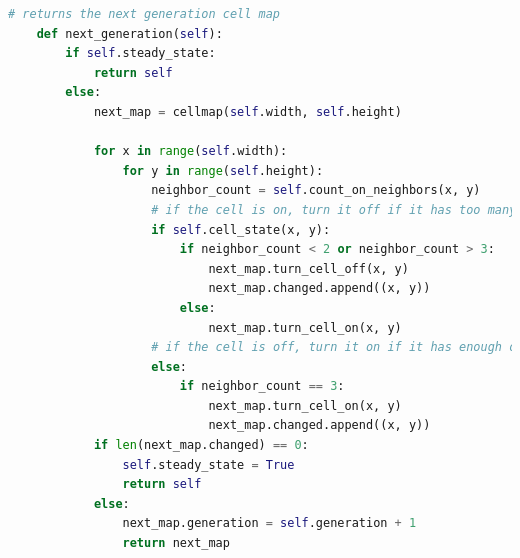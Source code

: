 \documentclass[12pt]{report}
\begin{document}
\begin{lstlisting}[language=Python, caption=cell\_map.py]
    # returns the next generation cell map
    def next_generation(self):
        if self.steady_state:
            return self
        else:
            next_map = cellmap(self.width, self.height)

            for x in range(self.width):
                for y in range(self.height):
                    neighbor_count = self.count_on_neighbors(x, y)
                    # if the cell is on, turn it off if it has too many or too few on neighbors
                    if self.cell_state(x, y):
                        if neighbor_count < 2 or neighbor_count > 3:
                            next_map.turn_cell_off(x, y)
                            next_map.changed.append((x, y))
                        else:
                            next_map.turn_cell_on(x, y)
                    # if the cell is off, turn it on if it has enough on neighbors
                    else:
                        if neighbor_count == 3:
                            next_map.turn_cell_on(x, y)
                            next_map.changed.append((x, y))
            if len(next_map.changed) == 0:
                self.steady_state = True
                return self
            else:
                next_map.generation = self.generation + 1
                return next_map
\end{lstlisting}
\end{document}

